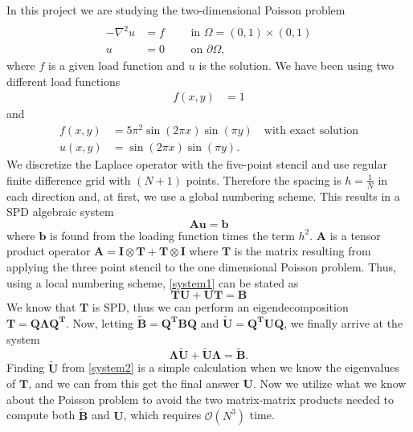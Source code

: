 In this project we are studying the two-dimensional Poisson problem
\begin{align}\\
\label{Poisson}
-\nabla^2u&=f \quad\quad\text{ in } \Omega=(0,1)\times(0,1)\\
u&=0 \quad\quad\text{ on } \partial \Omega, \nonumber
\end{align}
where $f$ is a given load function and $u$ is the solution. We have been using two different load functions
\begin{align*}
f(x,y)&=1
\end{align*}
and
\begin{align}
\label{loadfunc2}
f(x,y)&=5\pi^2\sin(2\pi x)\sin(\pi y) \quad\text{with exact solution} \\
u(x,y)&=\sin(2\pi x)\sin(\pi y).\nonumber
\end{align}
We discretize the Laplace operator with the five-point stencil and use regular finite difference grid with $(N+1)$ points. Therefore the spacing is $h = \frac{1}{N}$ in each direction and, at first, we use a global numbering scheme. This results in a SPD algebraic system
\begin{equation}
	\mathbf{Au} = \mathbf{b}
	\label{system1}
\end{equation}
where $\mathbf{b}$ is found from the loading function times the term $h^2$. $\mathbf{A}$ is a tensor product operator $\mathbf{A} = \mathbf{I}\otimes\mathbf{T} + \mathbf{T}\otimes\mathbf{I}$ where $\mathbf{T}$ is the matrix resulting from applying the three point stencil to the one dimensional Poisson problem. Thus, using a local numbering scheme, \eqref{system1} can be stated as 
\begin{equation}
	\mathbf{TU} + \mathbf{UT} = \mathbf{B}
\end{equation}
We know that $\mathbf{T}$ is SPD, thus we can perform an eigendecomposition $\mathbf{T} = \mathbf{Q\Lambda Q^T}$. Now, letting $\mathbf{\widetilde{B}} = \mathbf{Q^TBQ}$ and $\mathbf{\widetilde{U}} = \mathbf{Q^TUQ}$, we finally arrive at the system 
\begin{equation}
	\mathbf{\Lambda\widetilde{U}} + \mathbf{\widetilde{U}\Lambda} = \mathbf{\widetilde{B}}.
	\label{system2}
\end{equation}
Finding $\mathbf{\widetilde{U}}$ from \eqref{system2} is a simple calculation when we know the eigenvalues of $\mathbf{T}$, and we can from this get the final answer $\mathbf{U}$. Now we utilize what we know about the Poisson problem to avoid the two matrix-matrix products needed to compute both $\mathbf{\widetilde{B}}$ and $\mathbf{U}$, which requires $\mathcal{O}(N^3)$ time. \\
